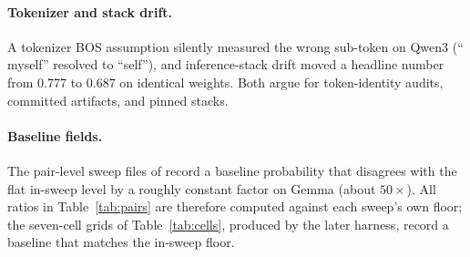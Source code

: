 \documentclass[11pt]{article}
\begin{document}
\paragraph{Tokenizer and stack drift.}
A tokenizer BOS assumption silently measured the wrong sub-token on Qwen3 (`` myself'' resolved to ``self''), and inference-stack drift moved a headline number from 0.777 to 0.687 on identical weights. Both argue for token-identity audits, committed artifacts, and pinned stacks.

\paragraph{Baseline fields.}
The pair-level sweep files of \citet{pliprs2026} record a baseline probability that disagrees with the flat in-sweep level by a roughly constant factor on Gemma (about $50\times$). All ratios in Table~\ref{tab:pairs} are therefore computed against each sweep's own floor; the seven-cell grids of Table~\ref{tab:cells}, produced by the later harness, record a baseline that matches the in-sweep floor.
\end{document}
